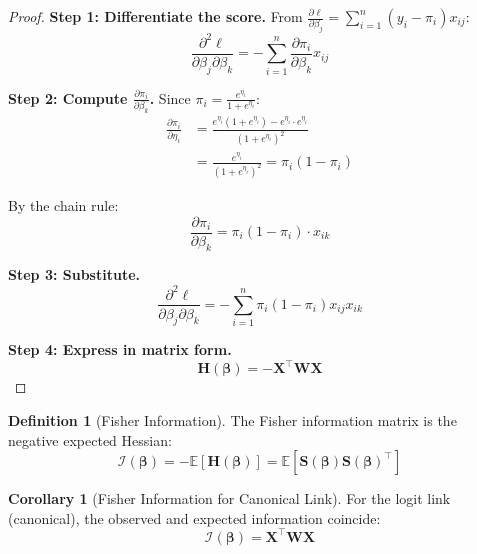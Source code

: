 \documentclass[11pt,letterpaper]{article}
\theoremstyle{definition}
\newtheorem{definition}{Definition}[section]
\newtheorem{corollary}[theorem]{Corollary}
\newcommand{\E}{\mathbb{E}}
\newcommand{\X}{\mathbf{X}}
\newcommand{\bb}{\boldsymbol{\beta}}
\newcommand{\W}{\mathbf{W}}
\newcommand{\I}{\mathcal{I}}
\begin{document}
\begin{proof}
\textbf{Step 1: Differentiate the score.}
From $\frac{\partial \ell}{\partial \beta_j} = \sum_{i=1}^{n} (y_i - \pi_i) x_{ij}$:
\begin{equation}
    \frac{\partial^2 \ell}{\partial \beta_j \partial \beta_k} = -\sum_{i=1}^{n} \frac{\partial \pi_i}{\partial \beta_k} x_{ij}
\end{equation}

\textbf{Step 2: Compute $\frac{\partial \pi_i}{\partial \beta_k}$.}
Since $\pi_i = \frac{e^{\eta_i}}{1 + e^{\eta_i}}$:
\begin{align}
    \frac{\partial \pi_i}{\partial \eta_i} &= \frac{e^{\eta_i}(1+e^{\eta_i}) - e^{\eta_i} \cdot e^{\eta_i}}{(1+e^{\eta_i})^2} \\
    &= \frac{e^{\eta_i}}{(1+e^{\eta_i})^2} = \pi_i(1-\pi_i)
\end{align}

By the chain rule:
\begin{equation}
    \frac{\partial \pi_i}{\partial \beta_k} = \pi_i(1-\pi_i) \cdot x_{ik}
\end{equation}

\textbf{Step 3: Substitute.}
\begin{equation}
    \frac{\partial^2 \ell}{\partial \beta_j \partial \beta_k} = -\sum_{i=1}^{n} \pi_i(1-\pi_i) x_{ij} x_{ik}
\end{equation}

\textbf{Step 4: Express in matrix form.}
\begin{equation}
    \mathbf{H}(\bb) = -\X^\top \W \X
\end{equation}
\end{proof}

\begin{definition}[Fisher Information]
The Fisher information matrix is the negative expected Hessian:
\begin{equation}
    \I(\bb) = -\E[\mathbf{H}(\bb)] = \E\left[\mathbf{S}(\bb)\mathbf{S}(\bb)^\top\right]
\end{equation}
\end{definition}

\begin{corollary}[Fisher Information for Canonical Link]
For the logit link (canonical), the observed and expected information coincide:
\begin{equation}
    \I(\bb) = \X^\top \W \X
    \label{eq:fisher}
\end{equation}
\end{corollary}
\end{document}
